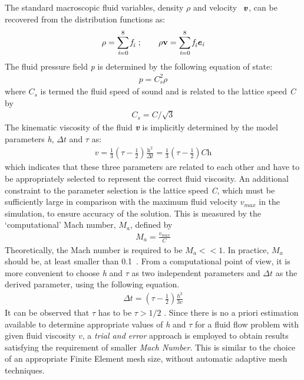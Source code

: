 The standard macroscopic fluid variables, density $\rho$ and velocity $\textbf{\textit{ v}}$, can be recovered from the distribution functions as:
\begin{align}
\rho = \sum\limits_{\textit{i}=0}^{8}{\textit{f}_{\textit{i}}}\mbox{ }; \qquad \rho \textbf{v} = \sum\limits_{\textit{i}=0}^{8}{\textit{f}_{\textit{i}}\textbf{\textit{e}}_{\textit{i}}}
\end{align}
The fluid pressure field \textit{p} is determined by the following equation of state:
\begin{align}
\textit{p}=\textit{C}_{\textit{s}}^{2} \rho
\end{align}
where $\textit{C}_{\textit{s}}$ is termed the fluid speed of sound and is related to the lattice speed \textit{C} by
\begin{align}
\textit{C}_{s}=\textit{C}/\sqrt{3}
\end{align}
The kinematic viscosity of the fluid \textbf{\textit{v}} is implicitly determined by the model parameters \textit{h}, $\Delta \textit{t}$ and $\tau$ as:
\begin{align}
\textit{v}=\frac{1}{3}(\tau - \frac{1}{2})\frac{\textit{h}^{2}}{\Delta \textit{t}} = \frac{1}{3}(\tau - \frac{1}{2})\textit{Ch}
\end{align}
which indicates that these three parameters are related to each other and have to be appropriately selected to represent the correct fluid viscosity. An additional constraint to the parameter selection is the lattice speed \textit{C}, which must be sufficiently large in comparison with the maximum fluid velocity $\textit{v}_{\textit{max}}$ in the simulation, to ensure accuracy of the solution. This is measured by the `computational' Mach number, $\textit{M}_{\textit{a}}$, defined by
\begin{align}
\textit{M}_{\textit{a}}=\frac{\textit{v}_{\textit{max}}}{\textit{C}}
\end{align}
Theoretically, the Mach number is required to be $\textit{M}_{\textit{a}}<< 1$. In practice, $\textit{M}_{\textit{a}}$ should be, at least smaller than 0.1~\citep{he1997}. From a computational point of view, it is more convenient to choose \textit{h} and $\tau$ as two independent parameters and $\Delta \textit{t}$ as the derived parameter, using the following equation.
\begin{align}
\Delta \textit{t} = (\tau - \frac{1}{2}) \frac{h^{2}}{3\textit{v}}
\end{align}
It can be observed that $\tau$ has to be $\tau > 1/2$ \citep{he1997}. Since there is no a priori estimation available to determine appropriate values of \textit{h} and $\tau$ for a fluid flow problem with given fluid viscosity $\textit{v}$, a \textit{trial and error} approach is employed to obtain results satisfying the requirement of smaller \textit{Mach Number}. This is similar to the choice of an appropriate Finite Element mesh size, without automatic adaptive mesh techniques. 
